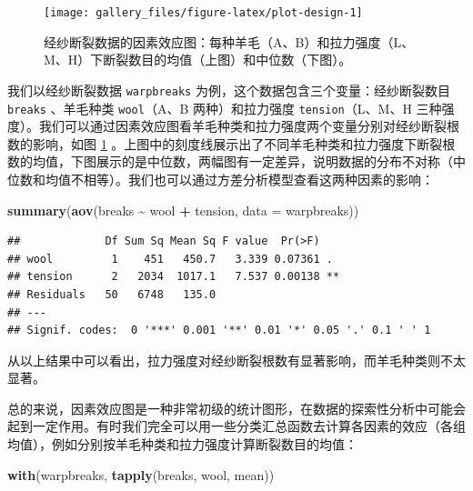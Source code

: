 \documentclass[
  b5paper,
  UTF8,twoside]{book}
\newenvironment{Shaded}{\begin{snugshade}}{\end{snugshade}}
\newcommand{\AttributeTok}[1]{\textcolor[rgb]{0.13,0.29,0.53}{#1}}
\newcommand{\FunctionTok}[1]{\textcolor[rgb]{0.13,0.29,0.53}{\textbf{#1}}}
\newcommand{\NormalTok}[1]{#1}
\newcommand{\SpecialCharTok}[1]{\textcolor[rgb]{0.81,0.36,0.00}{\textbf{#1}}}
\begin{document}
\begin{figure}

{\centering \texttt{[image: gallery\_files/figure-latex/plot-design-1]} 

}

\caption[经纱断裂数据的因素效应图]{经纱断裂数据的因素效应图：每种羊毛（A、B）和拉力强度（L、M、H）下断裂数目的均值（上图）和中位数（下图）。}\label{fig:plot-design}
\end{figure}

我们以经纱断裂数据 \texttt{warpbreaks} 为例，这个数据包含三个变量：经纱断裂数目 \texttt{breaks} 、羊毛种类 \texttt{wool}（A、B 两种）和拉力强度 \texttt{tension}（L、M、H 三种强度）。我们可以通过因素效应图看羊毛种类和拉力强度两个变量分别对经纱断裂根数的影响，如图 \ref{fig:plot-design}
。上图中的刻度线展示出了不同羊毛种类和拉力强度下断裂根数的均值，下图展示的是中位数，两幅图有一定差异，说明数据的分布不对称（中位数和均值不相等）。我们也可以通过方差分析模型查看这两种因素的影响：

\begin{Shaded}
\begin{Highlighting}[]
\FunctionTok{summary}\NormalTok{(}\FunctionTok{aov}\NormalTok{(breaks }\SpecialCharTok{\textasciitilde{}}\NormalTok{ wool }\SpecialCharTok{+}\NormalTok{ tension, }\AttributeTok{data =}\NormalTok{ warpbreaks))}
\end{Highlighting}
\end{Shaded}

\begin{verbatim}
##             Df Sum Sq Mean Sq F value  Pr(>F)   
## wool         1    451   450.7   3.339 0.07361 . 
## tension      2   2034  1017.1   7.537 0.00138 **
## Residuals   50   6748   135.0                   
## ---
## Signif. codes:  0 '***' 0.001 '**' 0.01 '*' 0.05 '.' 0.1 ' ' 1
\end{verbatim}

从以上结果中可以看出，拉力强度对经纱断裂根数有显著影响，而羊毛种类则不太显著。

总的来说，因素效应图是一种非常初级的统计图形，在数据的探索性分析中可能会起到一定作用。有时我们完全可以用一些分类汇总函数去计算各因素的效应（各组均值），例如分别按羊毛种类和拉力强度计算断裂数目的均值：

\begin{Shaded}
\begin{Highlighting}[]
\FunctionTok{with}\NormalTok{(warpbreaks, }\FunctionTok{tapply}\NormalTok{(breaks, wool, mean))}
\end{Highlighting}
\end{Shaded}
\end{document}
